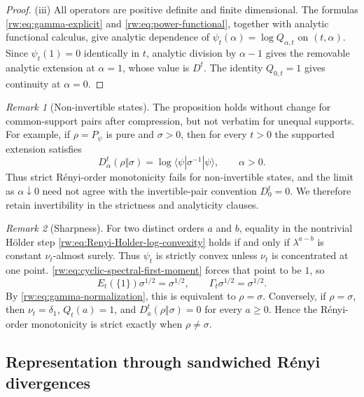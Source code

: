 \documentclass[11pt]{article}
\theoremstyle{remark}
\newtheorem{remark}[remark]{Remark}
\newcommand{\1}{\mathbbm{1}}
\begin{document}
\begin{proof}
\vspace{0.2cm}

\noindent (iii) All operators are positive definite and finite dimensional.
The formulas \eqref{rw:eq:gamma-explicit} and
\eqref{rw:eq:power-functional}, together with analytic
functional calculus, give analytic dependence of
$\psi_t(\alpha)=\log Q_{\alpha,t}$ on $(t,\alpha)$.  Since
$\psi_t(1)=0$ identically in $t$, analytic division by $\alpha-1$
gives the removable analytic extension at $\alpha=1$, whose value is
$D^t$.  The identity $Q_{0,t}=1$ gives continuity at $\alpha=0$.
\end{proof}

\begin{remark}[Non-invertible states]
The proposition holds without change for common-support pairs after
compression, but not verbatim for unequal supports.  For example, if
$\rho=P_\psi$ is pure and $\sigma>0$, then for every $t>0$ the
supported extension satisfies
\begin{equation}
 D_\alpha^t(\rho\Vert\sigma)
 =\log\langle\psi|\sigma^{-1}|\psi\rangle,
 \qquad \alpha>0.
\end{equation}
Thus strict R\'enyi-order monotonicity fails for non-invertible states, and the
limit as $\alpha\downarrow0$ need not agree with the invertible-pair
convention $D_0^t=0$.  We therefore retain invertibility in the
strictness and analyticity clauses.
\end{remark}

\begin{remark}[Sharpness]
\label{rw:rem:Renyi-order-sharpness}
For two distinct orders $a$ and $b$, equality in the nontrivial
H\"older step \eqref{rw:eq:Renyi-Holder-log-convexity} holds if and
only if $\lambda^{a-b}$ is constant $\nu_t$-almost surely.  Thus
$\psi_t$ is strictly convex unless $\nu_t$ is concentrated at one
point.  \eqref{rw:eq:cyclic-spectral-first-moment} forces
that point to be $1$, so
\begin{equation}
 E_t(\{1\})\sigma^{1/2}=\sigma^{1/2},
 \qquad
 \Gamma_t\sigma^{1/2}=\sigma^{1/2}.
\end{equation}
By \eqref{rw:eq:gamma-normalization}, this is equivalent to
$\rho=\sigma$.  Conversely, if $\rho=\sigma$, then
$\nu_t=\delta_1$, $Q_t(a)=1$, and $D_a^t(\rho\Vert\sigma)=0$ for
every $a\geq0$.  Hence the R\'enyi-order monotonicity is strict
exactly when $\rho\ne\sigma$.
\end{remark}


\subsection{Representation through sandwiched R\'enyi divergences}
\label{rw:subsec:sandwiched-representation}
\end{document}
